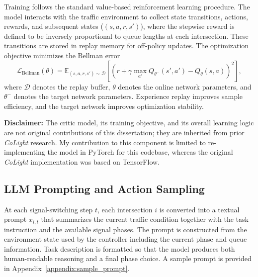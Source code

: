 

Training follows the standard value-based reinforcement learning procedure. The model interacts with the traffic environment to collect state transitions, actions, rewards, and subsequent states ($(s,a,r,s')$), where the stepwise reward is defined to be inversely proportional to queue lengths at each intersection. These transitions are stored in replay memory for off-policy updates. The optimization objective minimizes the Bellman error
\[
\mathcal{L}_{\mathrm{Bellman}}(\theta)
=
\mathbb{E}_{(s,a,r,s')\sim \mathcal{D}}
\left[
\left(
r + \gamma \max_{a'} Q_{\theta^-}(s',a') - Q_{\theta}(s,a)
\right)^2
\right],
\]
where $\mathcal{D}$ denotes the replay buffer, $\theta$ denotes the online network parameters, and $\theta^-$ denotes the target network parameters. Experience replay improves sample efficiency, and the target network improves optimization stability.

\textbf{Disclaimer:} The critic model, its training objective, and its overall learning logic are not original contributions of this dissertation; they are inherited from prior \textit{CoLight} research. My contribution to this component is limited to re-implementing the model in PyTorch for this codebase, whereas the original \textit{CoLight} implementation was based on TensorFlow.

\subsection{LLM Prompting and Action Sampling}
At each signal-switching step $t$, each intersection $i$ is converted into a textual prompt $x_{i,t}$ that summarizes the current traffic condition together with the task instruction and the available signal phases. The prompt is constructed from the environment state used by the controller including the current phase and queue information. Task description is formatted so that the model produces both human-readable reasoning and a final phase choice. A sample prompt is provided in Appendix~\ref{appendix:sample_prompt}.

